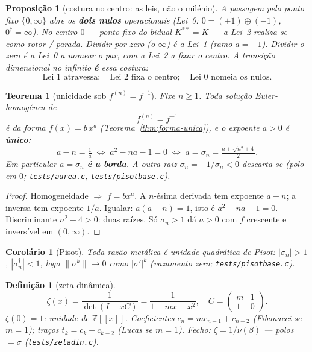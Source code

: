 \documentclass[11pt,a4paper]{article}
\newtheorem{definicao}{Definição}
\newtheorem{teorema}{Teorema}
\newtheorem{proposicao}{Proposição}
\newtheorem{corolario}{Corolário}
\newcommand{\code}[1]{\texttt{#1}}
\begin{document}
\begin{proposicao}[costura no centro: as leis, não o milénio]\label{prop:centro}
A passagem pelo ponto fixo $\{0,\infty\}$ abre os \textbf{dois nulos}
operacionais (Lei~0: $0=(+1)\oplus(-1)$, $0^{\dagger}=\infty$). No
centro $0$ --- ponto fixo do bidual $K^{**}=K$ --- a Lei~2
realiza-se como rotor / parada. Dividir \emph{por} zero (o $\infty$)
é a Lei~1 (ramo $a=-1$). Dividir \emph{o} zero é a Lei~0 a nomear o
par, com a Lei~2 a fixar o centro. A transição dimensional no infinito
\textbf{é} essa costura:
\[
\boxed{
\text{Lei~1 atravessa};\quad
\text{Lei~2 fixa o centro};\quad
\text{Lei~0 nomeia os nulos}.
}
\]
\end{proposicao}

\begin{teorema}[unicidade sob $f^{(n)}=f^{-1}$]\label{thm:unica-borda}
Fixe $n\geq1$. Toda solução Euler-homogénea de
\[
f^{(n)}=f^{-1}
\]
é da forma $f(x)=b\,x^{a}$ (Teorema~\ref{thm:forma-unica}), e o
expoente $a>0$ é \textbf{único}:
\[
a-n=\tfrac1a
\;\Longleftrightarrow\;
a^{2}-na-1=0
\;\Longleftrightarrow\;
a=\sigma_n=\tfrac{n+\sqrt{n^{2}+4}}{2}.
\]
Em particular $a=\sigma_n$ \textbf{é a borda}. A outra raiz
$\sigma_n^{\dagger}=-1/\sigma_n<0$ descarta-se (polo em $0$;
\code{tests/aurea.c}, \code{tests/pisotbase.c}).
\end{teorema}

\begin{proof}
Homogeneidade $\Rightarrow$ $f=bx^{a}$. A $n$-ésima derivada tem
expoente $a-n$; a inversa tem expoente $1/a$. Igualar:
$a(a-n)=1$, isto é $a^{2}-na-1=0$. Discriminante $n^{2}+4>0$:
duas raízes. Só $\sigma_n>1$ dá $a>0$ com $f$ crescente e
inversível em $(0,\infty)$.
\end{proof}

\begin{corolario}[Pisot]\label{thm:pisot}
Toda razão metálica é unidade quadrática de Pisot:
$|\sigma_n|>1$, $|\sigma_n^{\dagger}|<1$, logo
$\|\sigma^{k}\|\to0$ como $|\sigma'|^{k}$ (vazamento zero;
\code{tests/pisotbase.c}).
\end{corolario}

\begin{definicao}[zeta dinâmica]\label{def:zeta}
\[
\zeta(x)=\frac{1}{\det(I-xC)}=\frac{1}{1-mx-x^{2}},
\quad
C=\begin{pmatrix}m&1\\1&0\end{pmatrix}.
\]
$\zeta(0)=1$: unidade de $\mathbb{Z}[[x]]$. Coeficientes
$c_n=mc_{n-1}+c_{n-2}$ (Fibonacci se $m=1$); traços
$t_k=c_k+c_{k-2}$ (Lucas se $m=1$). Fecho:
$\zeta=1/\nu(\beta)$ --- polos $=\sigma$
(\code{tests/zetadin.c}).
\end{definicao}
\end{document}
